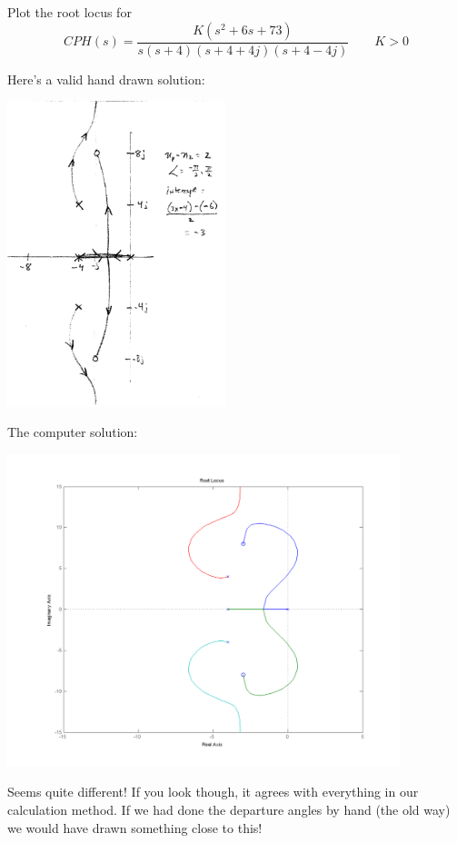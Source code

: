 \documentclass{article}	%
\begin{document}
Plot the root locus for
\[
CPH(s) = \frac{K(s^2+6s+73)}{s(s+4)(s+4+4j)(s+4-4j)} \qquad K>0
\]


\begin{solution}
Here's a valid hand drawn solution:

\includegraphics[width=2.5in]{00569a.png}


The computer solution:

\includegraphics[width=4.5in]{mt2_rla.png}

Seems quite different!   If you look though, it agrees with everything in our calculation method.   If we had done the departure angles by hand (the old way) we would have drawn something close to this!
\end{solution}




\end{document}
